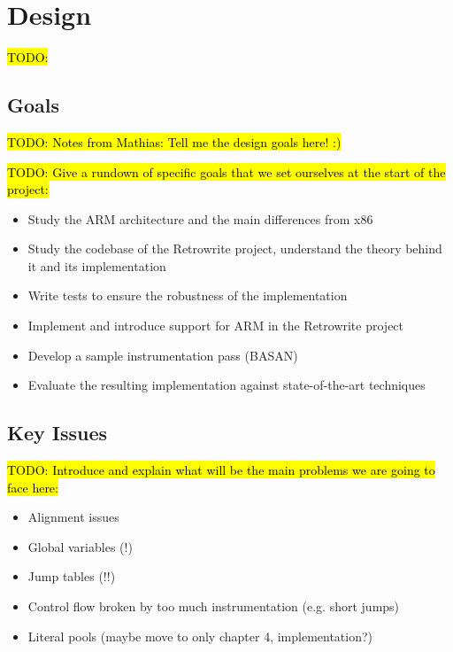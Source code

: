 \documentclass[a4paper,11pt,oneside]{report}
\newcommand{\todo}[1]{%
	\begingroup 
	\sethlcolor{cyan}%
	\hl{TODO: #1}%
	\endgroup
}
\begin{document}



\chapter{Design}

\todo{}

\section{Goals}

\todo{Notes from Mathias: Tell me the design goals here! :)}

\todo{Give a rundown of specific goals that we set ourselves at the start of 
the project:}
\begin{itemize}
	\item Study the ARM architecture and the main differences from x86
	\item Study the codebase of the Retrowrite project, understand the theory 
		behind it and its implementation
	\item Write tests to ensure the robustness of the implementation
	\item Implement and introduce support for ARM in the Retrowrite project
	\item Develop a sample instrumentation pass (BASAN)
	\item Evaluate the resulting implementation against state-of-the-art 
		techniques
\end{itemize}
	 

\section{Key Issues}
\todo{Introduce and explain what will be the main problems we are going to face 
here:}
\begin{itemize}
	\item Alignment issues
	\item Global variables (!)
	\item Jump tables (!!)
	\item Control flow broken by too much instrumentation (e.g. short jumps)
	\item Literal pools (maybe move to only chapter 4, implementation?)
\end{itemize}
\end{document}
